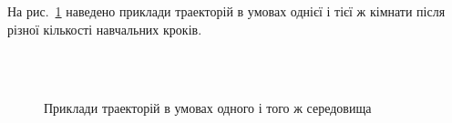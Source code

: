 \documentclass[a4paper,10pt,fleqn]{article}
\begin{document}
На рис.~\ref{fig:learning-samples} наведено приклади траекторій в умовах однієї і тієї ж кімнати після різної кількості навчальних кроків.
\begin{figure}
  \centering
  \,
   \\
  \,
  \caption{Приклади траекторій в умовах одного і того ж середовища}
  \label{fig:learning-samples}
\end{figure}
\end{document}
